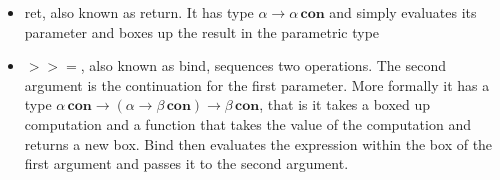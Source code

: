 \documentclass[12pt,twoside,notitlepage]{report}
\begin{document}
\begin{itemize}
\item{ret, also known as return. It has type $ \alpha \rightarrow \alpha \, \textbf{con} $ and simply evaluates its parameter and boxes up the result in the parametric type}
\item{$>>=$, also known as bind, sequences two operations. The second argument is the continuation for the first parameter. More formally it has a type $ \alpha \, \textbf{con} \rightarrow ( \alpha \rightarrow \beta \, \textbf{con}) \rightarrow \beta \, \textbf{con}  $, that is it takes a boxed up computation and a function that takes the value of the computation and returns a new box. Bind then evaluates the expression within the box of the first argument and passes it to the second argument.}

\end{itemize}
\end{document}

